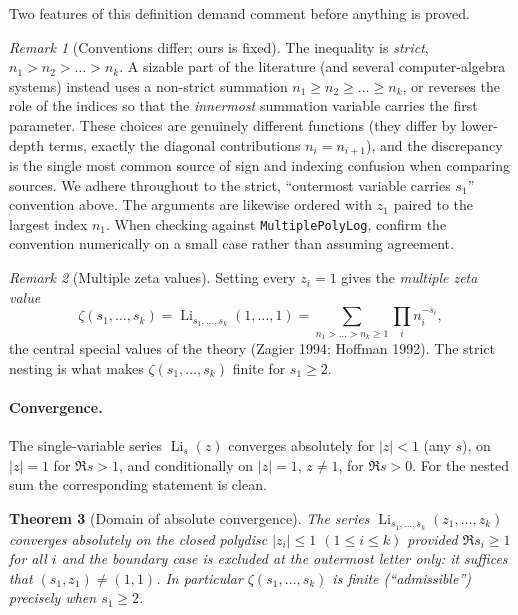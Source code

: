 \documentclass[11pt]{article}
\DeclareMathOperator{\Li}{Li}
\theoremstyle{plain}
\newtheorem{theorem}{Theorem}
\theoremstyle{remark}
\newtheorem{remark}[theorem]{Remark}
\begin{document}
Two features of this definition demand comment before anything is proved.

\begin{remark}[Conventions differ; ours is fixed]\label{rem:conv}
The inequality is \emph{strict}, $n_1>n_2>\dots>n_k$. A sizable part of the literature (and several computer-algebra systems) instead uses a non-strict summation $n_1\ge n_2\ge\dots\ge n_k$, or reverses the role of the indices so that the \emph{innermost} summation variable carries the first parameter. These choices are genuinely different functions (they differ by lower-depth terms, exactly the diagonal contributions $n_i=n_{i+1}$), and the discrepancy is the single most common source of sign and indexing confusion when comparing sources. We adhere throughout to the strict, ``outermost variable carries $s_1$'' convention above. The arguments are likewise ordered with $z_1$ paired to the largest index $n_1$. When checking against \texttt{MultiplePolyLog}, confirm the convention numerically on a small case rather than assuming agreement.
\end{remark}

\begin{remark}[Multiple zeta values]
Setting every $z_i=1$ gives the \emph{multiple zeta value}
\[
  \zeta(s_1,\dots,s_k)=\Li_{s_1,\dots,s_k}(1,\dots,1)
  =\sum_{n_1>\dots>n_k\ge1}\prod_i n_i^{-s_i},
\]
the central special values of the theory (Zagier 1994; Hoffman 1992). The strict nesting is what makes $\zeta(s_1,\dots,s_k)$ finite for $s_1\ge2$.
\end{remark}

\paragraph{Convergence.} The single-variable series $\Li_s(z)$ converges absolutely for $|z|<1$ (any $s$), on $|z|=1$ for $\Re s>1$, and conditionally on $|z|=1$, $z\ne1$, for $\Re s>0$. For the nested sum the corresponding statement is clean.

\begin{theorem}[Domain of absolute convergence]
The series $\Li_{s_1,\dots,s_k}(z_1,\dots,z_k)$ converges absolutely on the closed polydisc $|z_i|\le1$ $(1\le i\le k)$ provided $\Re s_i\ge1$ for all $i$ and the boundary case is excluded at the outermost letter only: it suffices that $(s_1,z_1)\ne(1,1)$. In particular $\zeta(s_1,\dots,s_k)$ is finite (``admissible'') precisely when $s_1\ge2$.
\end{theorem}
\end{document}
